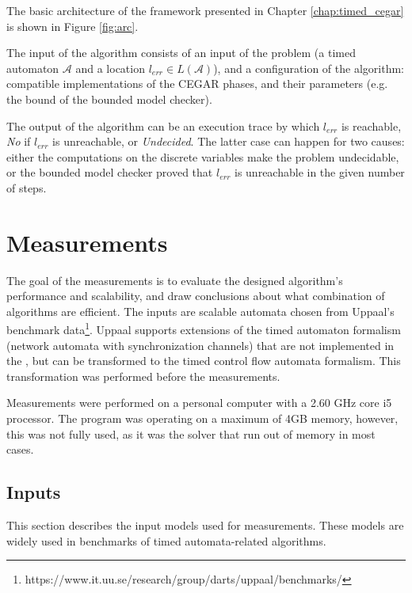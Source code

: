 The basic architecture of the framework presented in Chapter \ref{chap:timed_cegar} is shown in Figure \ref{fig:arc}.

The input of the algorithm consists of an input of the problem (a timed automaton $\mathcal{A}$ and a location $l_{err} \in L(\mathcal{A})$), and a configuration of the algorithm: compatible implementations of the CEGAR phases, and their parameters (e.g. the bound of the bounded model checker).

The output of the algorithm can be an execution trace by which $l_{err}$ is reachable, \emph{No} if $l_{err}$ is unreachable, or \emph{Undecided}. The latter case can happen for two causes: either the computations on the discrete variables make the problem undecidable, or the bounded model checker proved that $l_{err}$ is unreachable in the given number of steps. 



\section{Measurements}

The goal of the measurements is to evaluate the designed algorithm's performance and scalability, and draw conclusions about what combination of algorithms are efficient. The inputs are scalable automata chosen from Uppaal's benchmark data\footnote{https://www.it.uu.se/research/group/darts/uppaal/benchmarks/}. Uppaal supports extensions of the timed automaton formalism (network automata with synchronization channels) that are not implemented in the \ttmcfw, but can be transformed to the timed control flow automata formalism. This transformation was performed before the measurements.

Measurements were performed on a personal computer with a 2.60 GHz core i5 processor. The program was operating on a maximum of 4GB memory, however, this was not fully used, as it was the solver that run out of memory in most cases.

\subsection{Inputs}

This section describes the input models used for measurements. These models are widely used in benchmarks of timed automata-related algorithms.


